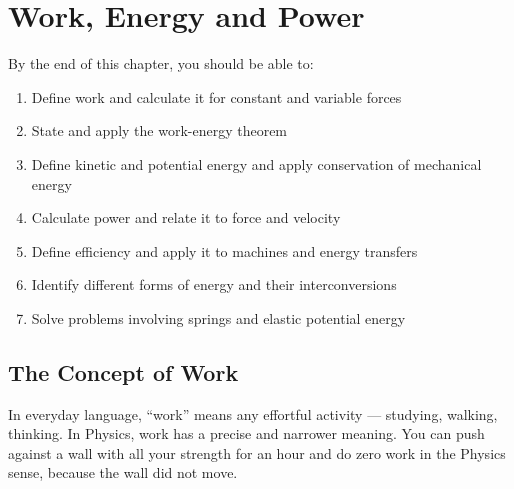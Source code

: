 %

\chapter{Work, Energy and Power}
\label{ch:work_energy_power}


\begin{objectivebox}
By the end of this chapter, you should be able to:
\begin{enumerate}[noitemsep]
  \item Define work and calculate it for constant and
  variable forces
  \item State and apply the work-energy theorem
  \item Define kinetic and potential energy and apply
  conservation of mechanical energy
  \item Calculate power and relate it to force and
  velocity
  \item Define efficiency and apply it to machines and
  energy transfers
  \item Identify different forms of energy and their
  interconversions
  \item Solve problems involving springs and elastic
  potential energy
\end{enumerate}
\end{objectivebox}

\vspace{0.4cm}

\minitoc

\vspace{0.5cm}

\section{The Concept of Work}

In everyday language, ``work'' means any effortful
activity --- studying, walking, thinking. In Physics,
work has a precise and narrower meaning. You can push
against a wall with all your strength for an hour and
do zero work in the Physics sense, because the wall
did not move.

